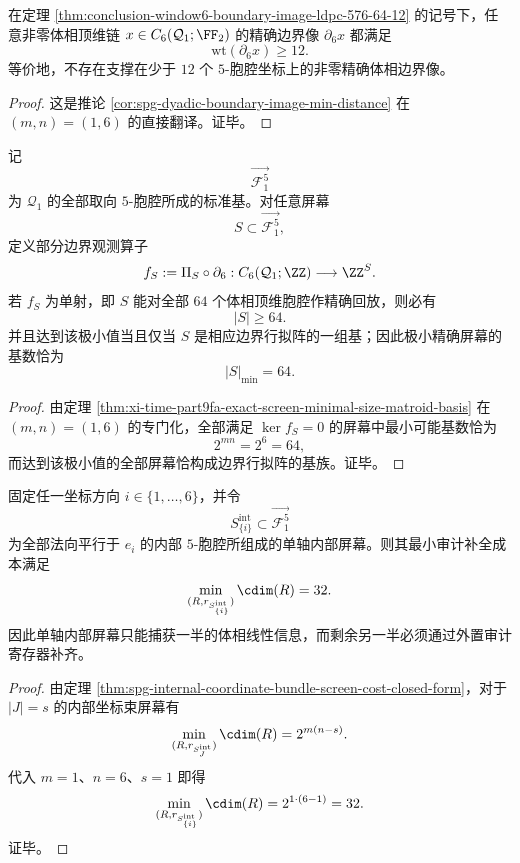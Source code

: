 \begin{corollary}\label{cor:conclusion-window6-boundary-ldpc-minsupport-12}
在定理 \ref{thm:conclusion-window6-boundary-image-ldpc-576-64-12} 的记号下，任意非零体相顶维链 \(x\in C_6(\mathcal Q_1;\FF_2)\) 的精确边界像 \(\partial_6 x\) 都满足
\[
\mathrm{wt}(\partial_6 x)\ge 12.
\]
等价地，不存在支撑在少于 \(12\) 个 \(5\)-胞腔坐标上的非零精确体相边界像。
\end{corollary}
\begin{proof}
这是推论 \ref{cor:spg-dyadic-boundary-image-min-distance} 在 \((m,n)=(1,6)\) 的直接翻译。证毕。
\end{proof}

\begin{theorem}\label{thm:conclusion-window6-exact-screen-minimal-size-64}
记
\[
\overrightarrow{\mathcal F_1^5}
\]
为 \(\mathcal Q_1\) 的全部取向 \(5\)-胞腔所成的标准基。对任意屏幕
\[
S\subset \overrightarrow{\mathcal F_1^5},
\]
定义部分边界观测算子
\[
f_S:=\Pi_S\circ \partial_6:
C_6(\mathcal Q_1;\ZZ)\longrightarrow \ZZ^S.
\]
若 \(f_S\) 为单射，即 \(S\) 能对全部 \(64\) 个体相顶维胞腔作精确回放，则必有
\[
|S|\ge 64.
\]
并且达到该极小值当且仅当 \(S\) 是相应边界行拟阵的一组基；因此极小精确屏幕的基数恰为
\[
|S|_{\min}=64.
\]
\end{theorem}
\begin{proof}
由定理 \ref{thm:xi-time-part9fa-exact-screen-minimal-size-matroid-basis} 在 \((m,n)=(1,6)\) 的专门化，全部满足 \(\ker f_S=0\) 的屏幕中最小可能基数恰为
\[
2^{mn}=2^6=64,
\]
而达到该极小值的全部屏幕恰构成边界行拟阵的基族。证毕。
\end{proof}

\begin{corollary}\label{cor:conclusion-window6-single-axis-screen-blind-rank-32}
固定任一坐标方向 \(i\in\{1,\dots,6\}\)，并令
\[
S_{\{i\}}^{\mathrm{int}}\subset \overrightarrow{\mathcal F_1^5}
\]
为全部法向平行于 \(e_i\) 的内部 \(5\)-胞腔所组成的单轴内部屏幕。则其最小审计补全成本满足
\[
\min_{(R,r_{S_{\{i\}}^{\mathrm{int}}})}\cdim(R)=32.
\]
因此单轴内部屏幕只能捕获一半的体相线性信息，而剩余另一半必须通过外置审计寄存器补齐。
\end{corollary}
\begin{proof}
由定理 \ref{thm:spg-internal-coordinate-bundle-screen-cost-closed-form}，对于 \(|J|=s\) 的内部坐标束屏幕有
\[
\min_{(R,r_{S_J^{\mathrm{int}}})}\cdim(R)=2^{m(n-s)}.
\]
代入 \(m=1\)、\(n=6\)、\(s=1\) 即得
\[
\min_{(R,r_{S_{\{i\}}^{\mathrm{int}}})}\cdim(R)=2^{1\cdot(6-1)}=32.
\]
证毕。
\end{proof}


